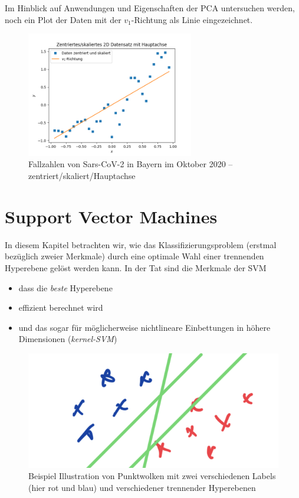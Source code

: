 \documentclass[
]{book}
\providecommand{\tightlist}{%
  \setlength{\itemsep}{0pt}\setlength{\parskip}{0pt}}
\theoremstyle{definition}
\theoremstyle{definition}
\theoremstyle{definition}
\theoremstyle{definition}
\theoremstyle{remark}
\begin{document}
Im Hinblick auf Anwendungen und Eigenschaften der PCA untersuchen werden, noch ein Plot der Daten mit der \(v_1\)-Richtung als Linie eingezeichnet.

\begin{figure}
\hypertarget{fig:cases-cntrd-HA}{%
\centering
\includegraphics[width=0.65\textwidth,height=\textheight]{bilder/07-covid-cntrd-HA.png}
\caption{Fallzahlen von Sars-CoV-2 in Bayern im Oktober
2020 -- zentriert/skaliert/Hauptachse}\label{fig:cases-cntrd-HA}
}
\end{figure}

\hypertarget{support-vector-machines}{%
\chapter{Support Vector Machines}\label{support-vector-machines}}

\newcommand\ipro[2]{\bigl \langle #1, \, #2\bigr\rangle }

In diesem Kapitel betrachten wir, wie das Klassifizierungsproblem (erstmal
bezüglich zweier Merkmale) durch eine optimale Wahl einer trennenden
Hyperebene gelöst werden kann.
In der Tat sind die Merkmale der SVM

\begin{itemize}
\tightlist
\item
  dass die \emph{beste} Hyperebene
\item
  effizient berechnet wird
\item
  und das sogar für möglicherweise nichtlineare Einbettungen in
  höhere Dimensionen (\emph{kernel-SVM})
\end{itemize}

\begin{figure}
\centering
\includegraphics{bilder/08_hyperebene-punkte-bsp.png}
\caption{Beispiel Illustration von Punktwolken mit zwei verschiedenen Labels (hier rot
und blau) und verschiedener trennender Hyperebenen}
\end{figure}
\end{document}
